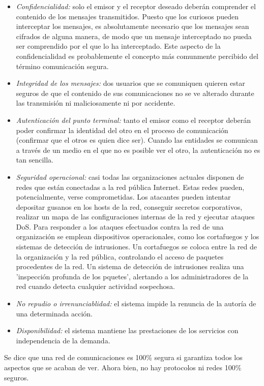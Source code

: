 \documentclass[a4paper,11pt]{article}
\begin{document}
\begin{itemize}
\item \textit{Confidencialidad:} solo el emisor y el receptor deseado deberán comprender el contenido de los mensajes transmitidos. Puesto que los curiosos pueden interceptar los mensajes, es absolutamente necesario que los mensajes sean cifrados de alguna manera, de modo que un mensaje interceptado no pueda ser comprendido por el que lo ha interceptado. Este aspecto de la confidencialidad es probablemente el concepto más comunmente percibido del término comunicación segura.

\item \textit{Integridad de los mensajes:} dos usuarios que se comuniquen quieren estar seguros de que el contenido de sus comunicaciones no se ve alterado durante las transmisión ni maliciosamente ni por accidente.

\item \textit{Autenticación del punto terminal:} tanto el emisor como el receptor deberán poder confirmar la identidad del otro en el proceso de comunicación (confirmar que el otros es quien dice ser). Cuando las entidades se comunican a través de un medio en el que no es posible ver el otro, la autenticación no es tan sencilla.

\item \textit{Seguridad operacional:} casi todas las organizaciones actuales disponen de redes que están conectadas a la red pública Internet. Estas redes pueden, potencialmente, verse comprometidas. Los atacantes pueden intentar depositar gusanos en los hosts de la red, conseguir secretos corporativos, realizar un mapa de las configuraciones internas de la red y ejecutar ataques DoS. Para responder a los ataques efectuados contra la red de una organización se emplean dispositivos operacionales, como los cortafuegos y los sistemas de detección de intrusiones. Un cortafuegos se coloca entre la red de la organización y la red pública, controlando el acceso de paquetes procedentes de la red. Un sistema de detección de intrusiones realiza una 'inspección profunda de los pquetes', alertando a los administradores de la red cuando detecta cualquier actividad sospechosa.

\item \textit{No repudio o irrenunciablidad:} el sistema impide la renuncia de la autoría de una determinada acción.

\item \textit{Disponibilidad:} el sistema mantiene las prestaciones de los servicios con independencia de la demanda.
\end{itemize}
Se dice que una red de comunicaciones es 100\% segura si garantiza todos los aspectos que se acaban de ver. Ahora bien, no hay protocolos ni redes 100\% seguros. \\
\end{document}
